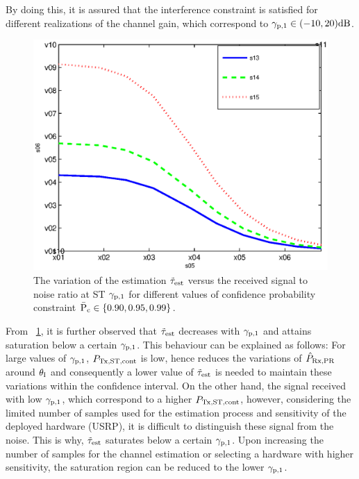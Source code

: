 By doing this, it is assured that the interference constraint is satisfied for different realizations of the channel gain, which correspond to ${\gamma}_{\text{p,1}} \in (-10,20)\SI{}{dB}$. 
%	
\begin{figure}
	\centering
	
	\includegraphics[width=\figscale]{figures/test_SNR}
	\caption{The variation of the estimation $\tilde{\tau}_{\text{est}}$ versus the received signal to noise ratio at ST ${\gamma}_{\text{p,1}}$ for different values of confidence probability constraint $\bar{\text{P}}_{\text{c}} \in \{0.90,0.95,0.99 \}$.}
	\label{fig:Tausnr}
\end{figure}

From \figurename~\ref{fig:Tausnr}, it is further observed that $\tilde{\tau}_{\text{est}}$ decreases with ${\gamma}_{\text{p,1}}$ and attains saturation below a certain ${\gamma}_{\text{p,1}}$. %
This behaviour can be explained as follows: For large values of ${\gamma}_{\text{p,1}}$, $P_{\text{Tx,ST,cont}}$ is low, hence reduces the variations of $\hat{P}_{\text{Rx,PR}}$ around $\theta_{\text{I}}$ and consequently a lower value of $\tilde{\tau}_{\text{est}}$ is needed to maintain these variations within the confidence interval. On the other hand, the signal received with low ${\gamma}_{\text{p,1}}$, which correspond to a higher $P_{\text{Tx,ST,cont}}$, however, considering the limited number of samples used for the estimation process and sensitivity of the deployed hardware (USRP), it is difficult to distinguish these signal from the noise. This is why, $\tilde{\tau}_{\text{est}}$ saturates below a certain ${\gamma}_{\text{p,1}}$. Upon increasing the number of samples for the channel estimation or selecting a hardware with higher sensitivity, the saturation region can be reduced to the lower ${\gamma}_{\text{p,1}}$. 


